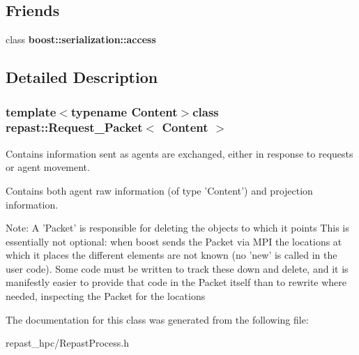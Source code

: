 \subsection*{Friends}
\begin{DoxyCompactItemize}
\item 
\hypertarget{classrepast_1_1_request___packet_ac98d07dd8f7b70e16ccb9a01abf56b9c}{class {\bfseries boost\-::serialization\-::access}}\label{classrepast_1_1_request___packet_ac98d07dd8f7b70e16ccb9a01abf56b9c}

\end{DoxyCompactItemize}


\subsection{Detailed Description}
\subsubsection*{template$<$typename Content$>$class repast\-::\-Request\-\_\-\-Packet$<$ Content $>$}

Contains information sent as agents are exchanged, either in response to requests or agent movement. 

Contains both agent raw information (of type 'Content') and projection information.

Note\-: A 'Packet' is responsible for deleting the objects to which it points This is essentially not optional\-: when boost sends the Packet via M\-P\-I the locations at which it places the different elements are not known (no 'new' is called in the user code). Some code must be written to track these down and delete, and it is manifestly easier to provide that code in the Packet itself than to rewrite where needed, inspecting the Packet for the locations 

The documentation for this class was generated from the following file\-:\begin{DoxyCompactItemize}
\item 
repast\-\_\-hpc/Repast\-Process.\-h\end{DoxyCompactItemize}

